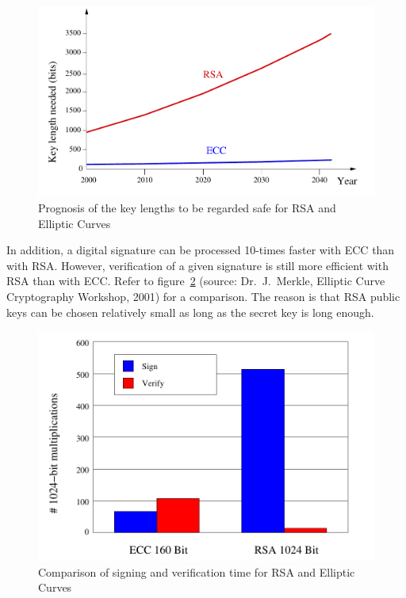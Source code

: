 \begin{figure}[ht]
\begin{center}
\includegraphics[scale=0.7]{figures/RSAKeyLength-2}
\caption{Prognosis of the key lengths to be regarded safe for RSA and
  Elliptic Curves\vspace{1ex}} 
\label{RSAKeylength}
\end{center}
\end{figure}

In addition, a digital signature can be processed 10-times faster with ECC
than with RSA.  However, verification of a given signature is still more
efficient with RSA than with ECC. Refer to
figure~\ref{ThousandBitMultiplications} (source: Dr.~J.\ Merkle, Elliptic
Curve Cryptography Workshop, 2001) for a comparison.  The reason is that
RSA public keys can be chosen relatively small as long as the secret key is
long enough.

\begin{figure}[ht]
\begin{center}
\vspace{1.5cm}\includegraphics[scale=0.7]{figures/ECCRSA}
\caption{Comparison of signing and verification time for RSA and Elliptic Curves} 
\label{ThousandBitMultiplications}
\end{center}
\end{figure}

